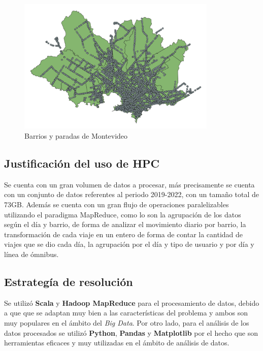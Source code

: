 \documentclass[conference]{IEEEtran}
\begin{document}
\begin{figure}[htbp]
\centerline{\includegraphics[width=95mm]{Pictures/paradas_mvd.png}}
\caption{Barrios y paradas de Montevideo}
\label{fig}
\end{figure}

\subsection{Justificación del uso de HPC}

Se cuenta con un gran volumen de datos a procesar, más precisamente se cuenta con un conjunto de datos referentes al periodo 2019-2022, con un tamaño total de 73GB. Además se cuenta con un gran flujo de operaciones paralelizables utilizando el paradigma MapReduce, como lo son la agrupación de los datos según el día y barrio, de forma de analizar el movimiento diario por barrio, la transformación de cada viaje en un entero de forma de contar la cantidad de viajes que se dio cada día, la agrupación por el día y tipo de usuario y por día y línea de ómnibus.

\subsection{Estrategía de resolución}

Se utilizó \textbf{Scala} y \textbf{Hadoop MapReduce} \cite{b9} para el procesamiento de datos, debido a que que se adaptan muy bien a las características del problema y ambos son muy populares en el ámbito del \textit{Big Data}. Por otro lado, para el análisis de los datos procesados se utilizó \textbf{Python}, \textbf{Pandas} \cite{b8} y \textbf{Matplotlib} \cite{b5} por el hecho que son herramientas eficaces y muy utilizadas en el ámbito de análisis de datos.
\end{document}
